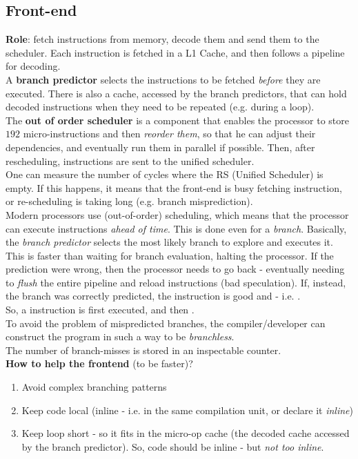 \documentclass[../template.tex]{subfiles}
\begin{document}
\subsection{Front-end}
\textbf{Role}: fetch instructions from memory, decode them and send them to the scheduler. Each instruction is fetched in a L1 Cache, and then follows a pipeline for decoding.\\
A \textbf{branch predictor} selects the instructions to be fetched \textit{before} they are executed. There is also a cache, accessed by the branch predictors, that can hold decoded instructions when they need to be repeated (e.g. during a loop).\\

The \textbf{out of order scheduler} is a component that enables the processor to store $192$ micro-instructions and then \textit{reorder them}, so that he can adjust their dependencies, and eventually run them in parallel if possible. Then, after rescheduling, instructions are sent to the unified scheduler.\\
One can measure the number of cycles where the RS (Unified Scheduler) is empty. If this happens, it means that the front-end is busy fetching instruction, or re-scheduling is taking long (e.g. branch misprediction).\\

Modern processors use  (out-of-order) scheduling, which means that the processor can execute instructions \textit{ahead of time}. This is done even for a \textit{branch}. Basically, the \textit{branch predictor} selects the most likely branch to explore and executes it. This is faster than waiting for branch evaluation, halting the processor. If the prediction were wrong, then the processor needs to go back - eventually needing to \textit{flush} the entire pipeline and reload instructions (bad speculation). If, instead, the branch was correctly predicted, the instruction is good and  - i.e. .\\
So, a instruction is first executed, and then .\\

To avoid the problem of mispredicted branches, the compiler/developer can construct the program in such a way to be \textit{branchless}.\\
The number of branch-misses is stored in an inspectable counter.\\

\textbf{How to help the frontend} (to be faster)?
\begin{enumerate}
    \item Avoid complex branching patterns
    \item Keep code local (inline - i.e. in the same compilation unit, or declare it \textit{inline})
    \item Keep loop short - so it fits in the micro-op cache (the decoded cache accessed by the branch predictor). So, code should be inline - but \textit{not too inline}. 
\end{enumerate}
 
\end{document}
